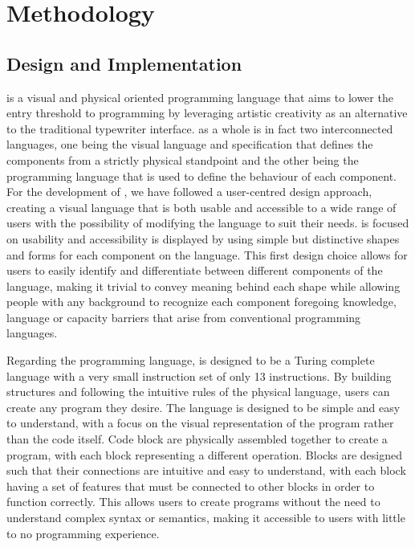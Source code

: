 \section{Methodology}
\label{sec:methodology}

\subsection{Design and Implementation}
\sculpt is a visual and physical oriented programming language that aims to lower the entry threshold to programming by leveraging artistic creativity as an alternative to the traditional typewriter interface.
\sculpt as a whole is in fact two interconnected languages, one being the visual language and specification that defines the components from a strictly physical standpoint and the other being the programming language that is used to define the behaviour of each component.
For the development of \sculpt, we have followed a user-centred design approach, creating a visual language that is both usable and accessible to a wide range of users with the possibility of modifying the language to suit their needs.
\sculpt is focused on usability and accessibility is displayed by using simple but distinctive shapes and forms for each component on the language.
This first design choice allows for users to easily identify and differentiate between different components of the language, making it trivial to convey meaning behind each shape while allowing people with any background to recognize each component foregoing knowledge, language or capacity barriers that arise from conventional programming languages.

Regarding the programming language, \sculpt is designed to be a Turing complete language with a very small instruction set of only 13 instructions.
By building structures and following the intuitive rules of the physical language, users can create any program they desire.
The language is designed to be simple and easy to understand, with a focus on the visual representation of the program rather than the code itself.
Code block are physically assembled together to create a program, with each block representing a different operation. Blocks are designed such that their connections are intuitive and easy to understand, with each block having a set of features that must be connected to other blocks in order to function correctly.
This allows users to create programs without the need to understand complex syntax or semantics, making it accessible to users with little to no programming experience.



